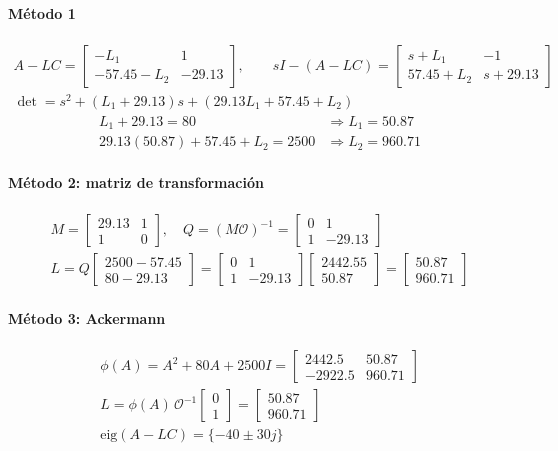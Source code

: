 \documentclass[11pt]{article}
\begin{document}
\paragraph{Método 1}
\begin{gather*}
A-LC=\begin{bmatrix}-L_1&1\\-57.45-L_2&-29.13\end{bmatrix},\qquad
sI-(A-LC)=\begin{bmatrix}s+L_1&-1\\57.45+L_2&s+29.13\end{bmatrix}\\
\det=s^2+(L_1+29.13)s+(29.13L_1+57.45+L_2)
\end{gather*}
\begin{align*}
L_1+29.13=80 &\Rightarrow L_1=50.87\\
29.13(50.87)+57.45+L_2=2500 &\Rightarrow L_2=960.71
\end{align*}
\paragraph{Método 2: matriz de transformación}
\begin{gather*}
M=\begin{bmatrix}29.13 & 1 \\ 1 & 0\end{bmatrix},\quad Q=(M\mathcal{O})^{-1}=\begin{bmatrix}0 & 1 \\ 1 & -29.13\end{bmatrix}\\
L=Q\begin{bmatrix}2500-57.45\\80-29.13\end{bmatrix}=\begin{bmatrix}0 & 1 \\ 1 & -29.13\end{bmatrix}\begin{bmatrix}2442.55\\50.87\end{bmatrix}=\begin{bmatrix}50.87 \\ 960.71\end{bmatrix}
\end{gather*}
\paragraph{Método 3: Ackermann}
\begin{gather*}
\phi(A)=A^2+80A+2500I=\begin{bmatrix}2442.5 & 50.87 \\ -2922.5 & 960.71\end{bmatrix}\\
L=\phi(A)\,\mathcal{O}^{-1}\begin{bmatrix}0\\1\end{bmatrix}=\begin{bmatrix}50.87 \\ 960.71\end{bmatrix}\\
\text{eig}(A-LC)=\{-40\pm30j\}
\end{gather*}
\end{document}

